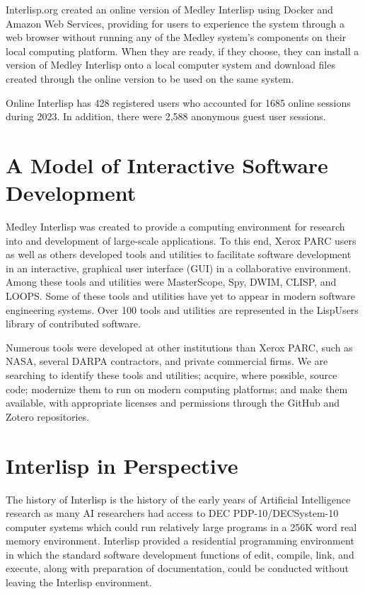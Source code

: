 \documentclass[sigconf]{acmart}
\begin{document}

Interlisp.org created an online version of Medley Interlisp using Docker and Amazon Web Services, providing for users to experience the system through a web browser without running any of the Medley system's components on their local computing platform. When they are ready, if they choose, they can install a version of Medley Interlisp onto a local computer system and download files created through the online version to be used on the same system.

Online Interlisp has 428 registered users who accounted for 1685 online sessions during 2023. In addition, there were 2,588 anonymous guest user sessions.

\section{A Model of Interactive Software Development}

Medley Interlisp was created to provide a computing environment for research into and development of large-scale applications. To this end, Xerox PARC users as well as others developed tools and utilities to facilitate software development in an interactive, graphical user interface (GUI) in a collaborative environment.\cite{Kaisler2021} Among these tools and utilities were MasterScope, Spy, DWIM, CLISP, and LOOPS. Some of these tools and utilities have yet to appear in modern software engineering systems. Over 100 tools and utilities are represented in the LispUsers library of contributed software.

Numerous tools were developed at other institutions than Xerox PARC, such as NASA, several DARPA contractors, and private commercial firms. We are searching to identify these tools and utilities; acquire, where possible, source code; modernize them to run on modern computing platforms; and make them available, with appropriate licenses and permissions through the GitHub and Zotero repositories.

\section{Interlisp in Perspective}

The history of Interlisp is the history of the early years of Artificial Intelligence research as many AI researchers had access to DEC PDP-10/DECSystem-10 computer systems which could run relatively large programs in a 256K word real memory environment\cite{Bobrow74}. Interlisp provided a residential programming environment in which the standard software development functions of edit, compile, link, and execute, along with preparation of documentation, could be conducted without leaving the Interlisp environment\cite{Teitelman73}.
\end{document}
